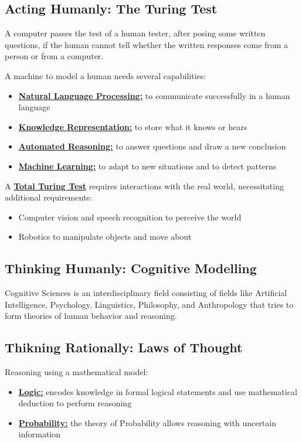 \documentclass[12pt]{article}
\newcommand{\definition}[1]{\underline{\textbf{#1}}}
\begin{document}
\subsection*{Acting Humanly: The Turing Test}

A computer passes the test of a human tester, after posing some written questions, 
if the human cannot tell whether the written responses come from a person or from a computer.

A machine to model a human needs several capabilities:
\begin{itemize}
    \item \definition{Natural Language Processing:} to communicate successfully in a human language
    \item \definition{Knowledge Representation:} to store what it knows or hears
    \item \definition{Automated Reasoning:} to answer questions and draw a new conclusion
    \item \definition{Machine Learning:} to adapt to new situations and to detect patterns
\end{itemize}

A \definition{Total Turing Test} requires interactions with the real world, necessitating additional requirements:
\begin{itemize}
    \item Computer vision and speech recognition to perceive the world
    \item Robotics to manipulate objects and move about
\end{itemize}


\subsection*{Thinking Humanly: Cognitive Modelling}

Cognitive Sciences is an interdisciplinary field consisting of fields like Artificial Intelligence, Psychology, Linguistics,
Philosophy, and Anthropology that tries to form theories of human behavior and reasoning.

\subsection*{Thikning Rationally: Laws of Thought}

Reasoning using a mathematical model:
\begin{itemize}
    \item \definition{Logic:} encodes knowledge in formal logical statements and use mathematical deduction to perform reasoning
    \item \definition{Probability:} the theory of Probability allows reasoning with uncertain information
\end{itemize}
\end{document}
